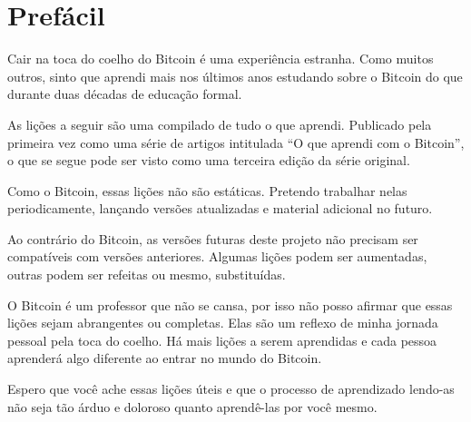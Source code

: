 \chapter*{Prefácil}

Cair na toca do coelho do Bitcoin é uma experiência estranha. Como muitos outros, sinto que aprendi mais nos últimos anos estudando sobre o Bitcoin do que durante duas décadas de educação formal.

As lições a seguir são uma compilado de tudo o que aprendi. Publicado pela primeira vez como uma série de artigos intitulada {“O que aprendi com o Bitcoin”}, o que se segue pode ser visto como uma terceira edição da série original.

Como o Bitcoin, essas lições não são estáticas. Pretendo trabalhar nelas periodicamente, lançando versões atualizadas e material adicional no futuro.

Ao contrário do Bitcoin, as versões futuras deste projeto não precisam ser compatíveis com versões anteriores. Algumas lições podem ser aumentadas, outras podem ser refeitas ou mesmo, substituídas.

O Bitcoin é um professor que não se cansa, por isso não posso afirmar que essas lições sejam abrangentes ou completas. Elas são um reflexo de minha jornada pessoal pela toca do coelho. Há mais lições a serem aprendidas e cada pessoa aprenderá algo diferente ao entrar no mundo do Bitcoin.

Espero que você ache essas lições úteis e que o processo de aprendizado lendo-as não seja tão árduo e doloroso quanto aprendê-las por você mesmo.

%
%
